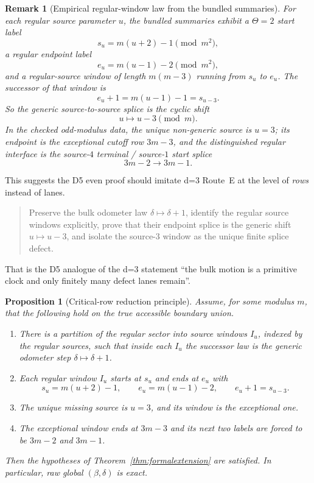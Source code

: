 \documentclass[11pt]{article}
\newtheorem{proposition}{Proposition}
\newtheorem{remark}{Remark}
\begin{document}
\begin{remark}[Empirical regular-window law from the bundled summaries]
For each regular source parameter $u$, the bundled summaries exhibit a
$\Theta=2$ start label
\[
 s_u = m(u+2)-1 \pmod{m^2},
\]
a regular endpoint label
\[
 e_u = m(u-1)-2 \pmod{m^2},
\]
and a regular-source window of length $m(m-3)$ running from $s_u$ to $e_u$.
The successor of that window is
\[
 e_u+1 = m(u-1)-1 = s_{u-3}.
\]
So the generic source-to-source splice is the cyclic shift
\[
 u \longmapsto u-3 \pmod m.
\]
In the checked odd-modulus data, the unique non-generic source is $u=3$; its
endpoint is the exceptional cutoff row $3m-3$, and the distinguished regular
interface is the source-$4$ terminal / source-$1$ start splice
\[
 3m-2 \to 3m-1.
\]
\end{remark}

This suggests the D5 even proof should imitate d=3 Route~E at the level of
\emph{rows} instead of lanes.

\begin{quote}
Preserve the bulk odometer law $\delta\mapsto\delta+1$, identify the regular
source windows explicitly, prove that their endpoint splice is the generic
shift $u\mapsto u-3$, and isolate the source-$3$ window as the unique finite
splice defect.
\end{quote}

That is the D5 analogue of the d=3 statement ``the bulk motion is a primitive
clock and only finitely many defect lanes remain''.

\begin{proposition}[Critical-row reduction principle]
Assume, for some modulus $m$, that the following hold on the true accessible
boundary union.
\begin{enumerate}[label=\textup{(\roman*)},leftmargin=2.5em]
    \item There is a partition of the regular sector into source windows
    $I_u$, indexed by the regular sources, such that inside each $I_u$ the
    successor law is the generic odometer step $\delta\mapsto\delta+1$.
    \item Each regular window $I_u$ starts at $s_u$ and ends at $e_u$ with
    \[
    s_u = m(u+2)-1,
    \qquad
    e_u = m(u-1)-2,
    \qquad
    e_u+1=s_{u-3}.
    \]
    \item The unique missing source is $u=3$, and its window is the
    exceptional one.
    \item The exceptional window ends at $3m-3$ and its next two labels are
    forced to be $3m-2$ and $3m-1$.
\end{enumerate}
Then the hypotheses of Theorem~\ref{thm:formalextension} are satisfied.
In particular, raw global $(\beta,\delta)$ is exact.
\end{proposition}
\end{document}
